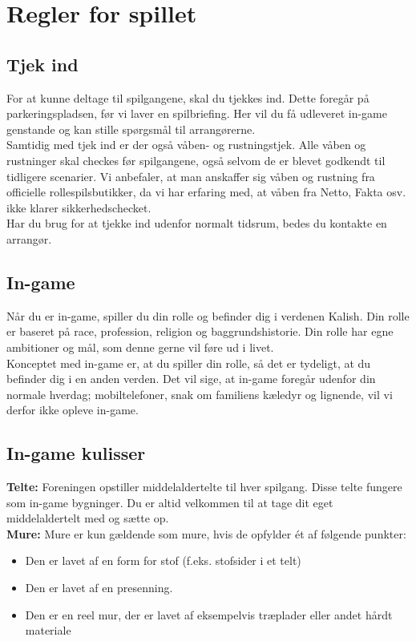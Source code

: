 \chapter{Regler for spillet}
\section{Tjek ind}
For at kunne deltage til spilgangene, skal du tjekkes ind. Dette foregår på parkeringspladsen, før vi laver en spilbriefing. Her vil du få udleveret in-game genstande og kan stille spørgsmål til arrangørerne.\\
Samtidig med tjek ind er der også våben- og rustningstjek. Alle våben og rustninger skal checkes før spilgangene, også selvom de er blevet godkendt til tidligere scenarier. Vi anbefaler, at man anskaffer sig
våben og rustning fra officielle rollespilsbutikker, da vi har erfaring med, at våben fra Netto, Fakta osv. ikke klarer sikkerhedschecket.\\
Har du brug for at tjekke ind udenfor normalt tidsrum, bedes du kontakte en arrangør.

\section{In-game}
Når du er in-game, spiller du din rolle og befinder dig i verdenen Kalish. Din rolle er baseret på race, profession, religion og baggrundshistorie. Din rolle har egne ambitioner og mål, som denne gerne vil føre ud i livet.\\
Konceptet med in-game er, at du spiller din rolle, så det er tydeligt, at du befinder dig i en anden verden. Det vil sige, at in-game foregår udenfor din normale hverdag; mobiltelefoner, snak om familiens kæledyr og lignende, vil vi derfor ikke opleve in-game.

\section{In-game kulisser}
\textbf{Telte:} Foreningen opstiller middelaldertelte til hver spilgang. Disse telte fungere som in-game bygninger. Du er altid velkommen til at tage dit eget middelaldertelt med og sætte op.\\
\textbf{Mure:} Mure er kun gældende som mure, hvis de opfylder ét af følgende punkter:
\begin{itemize}
    \item Den er lavet af en form for stof (f.eks. stofsider i et telt)
    \item Den er lavet af en presenning.
    \item Den er en reel mur, der er lavet af eksempelvis træplader eller andet hårdt materiale
\end{itemize}


